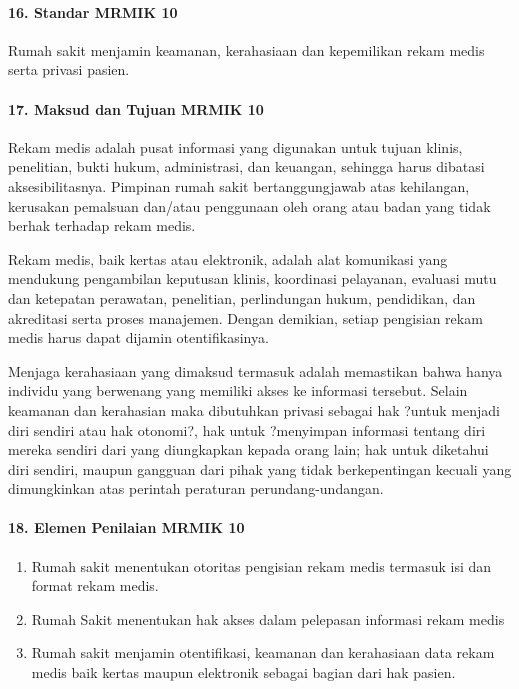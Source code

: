 \documentclass[
]{book}
\providecommand{\tightlist}{%
  \setlength{\itemsep}{0pt}\setlength{\parskip}{0pt}}
\begin{document}
\hypertarget{standar-mrmik-10}{%
\paragraph*{16. Standar MRMIK 10}\label{standar-mrmik-10}}

Rumah sakit menjamin keamanan, kerahasiaan dan kepemilikan rekam medis serta privasi pasien.

\hypertarget{maksud-dan-tujuan-mrmik-10}{%
\paragraph*{17. Maksud dan Tujuan MRMIK 10}\label{maksud-dan-tujuan-mrmik-10}}

Rekam medis adalah pusat informasi yang digunakan untuk tujuan klinis, penelitian, bukti hukum, administrasi, dan keuangan, sehingga harus dibatasi aksesibilitasnya. Pimpinan rumah sakit bertanggungjawab atas kehilangan, kerusakan pemalsuan dan/atau penggunaan oleh orang atau badan yang tidak berhak terhadap rekam medis.

Rekam medis, baik kertas atau elektronik, adalah alat komunikasi yang mendukung pengambilan keputusan klinis, koordinasi pelayanan, evaluasi mutu dan ketepatan perawatan, penelitian, perlindungan hukum, pendidikan, dan akreditasi serta proses manajemen. Dengan demikian, setiap pengisian rekam medis harus dapat dijamin otentifikasinya.

Menjaga kerahasiaan yang dimaksud termasuk adalah memastikan bahwa hanya individu yang berwenang yang memiliki akses ke informasi tersebut. Selain keamanan dan kerahasian maka dibutuhkan privasi sebagai hak ?untuk menjadi diri sendiri atau hak otonomi?, hak untuk ?menyimpan informasi tentang diri mereka sendiri dari yang diungkapkan kepada orang lain; hak untuk diketahui diri sendiri, maupun gangguan dari pihak yang tidak berkepentingan kecuali yang dimungkinkan atas perintah peraturan perundang-undangan.

\hypertarget{elemen-penilaian-mrmik-10}{%
\paragraph*{18. Elemen Penilaian MRMIK 10}\label{elemen-penilaian-mrmik-10}}

\begin{enumerate}
\def\labelenumi{\alph{enumi}.}
\tightlist
\item
  Rumah sakit menentukan otoritas pengisian rekam medis termasuk isi dan format rekam medis.
\item
  Rumah Sakit menentukan hak akses dalam pelepasan informasi rekam medis
\item
  Rumah sakit menjamin otentifikasi, keamanan dan kerahasiaan data rekam medis baik kertas maupun elektronik sebagai bagian dari hak pasien.
\end{enumerate}
\end{document}
